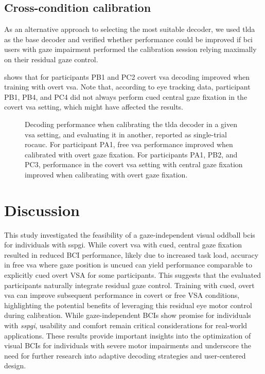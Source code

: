 \documentclass[twocolumn]{article}
\begin{document}
\subsection{Cross-condition calibration}
\label{sec:patients/outcomes/cross}

As an alternative approach to selecting the most suitable decoder, we used
\ac{tlda} as the base decoder and verified whether performance could be improved
if \ac{bci} users with gaze impairment performed the calibration session relying
maximally on their residual gaze control.

 shows that for participants PB1 and PC2 covert \ac{vsa} decoding
improved when training with overt \ac{vsa}.
Note that, according to eye tracking data, participant PB1, PB4, and PC4 did not
always perform cued central gaze fixation in the covert \ac{vsa} setting,
which might have affected the results.
\begin{figure}[t]
  
  \caption[Cross-setting calibration and decoding performance.]{
    Decoding performance when calibrating the \ac{tlda} decoder in a given \ac{vsa}
    setting, and evaluating it in another, reported as
    single-trial \ac{rocauc}.
    For participant PA1, free \ac{vsa} performance improved when
    calibrated with overt gaze fixation.
    For participants PA1, PB2, and PC3, performance in the covert \ac{vsa} setting with central gaze fixation
    improved when calibrating with overt gaze fixation.
  }
  \label{fig:patients/cross}
\end{figure}

\section{Discussion}

This study investigated the feasibility of a gaze-independent visual oddball
\acp{bci} for individuals with \ac{sspgi}.
While covert \ac{vsa} with cued, central gaze fixation resulted in reduced BCI
performance, likely due to increased task load, accuracy in free \ac{vsa} where gaze position is uncued can
yield performance comparable to explicitly cued overt \ac{VSA} for some
participants.
This suggests that the evaluated participants naturally integrate residual gaze control.
Training with cued, overt \ac{vsa} can improve subsequent performance in covert or free VSA conditions,
highlighting the potential benefits of leveraging this residual eye motor control
during calibration.
While gaze-independent BCIs show promise for individuals with \emph{sspgi},
usability and comfort remain critical considerations for real-world applications.
These results provide important insights into the optimization of visual BCIs for individuals with severe motor impairments and underscore the need for further research into adaptive decoding strategies and user-centered design.
\end{document}
